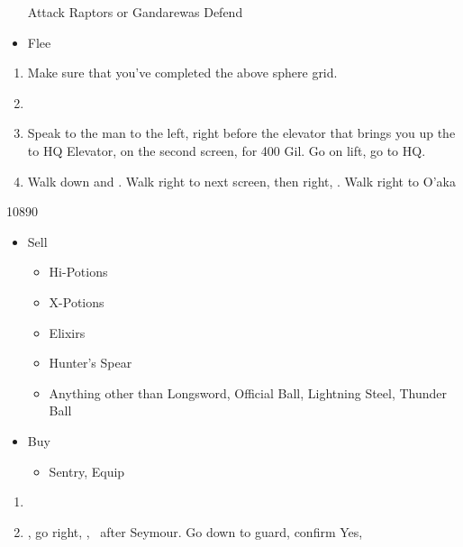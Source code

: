 \begin{encounters}
  \begin{itemize}
    \wakkaf Attack Raptors or Gandarewas
    \yunaf Defend
    \item Flee
  \end{itemize}
\end{encounters}
\begin{enumerate}[resume]
  \item Make sure that you've completed the above sphere grid.
  \item \formation{\tidus}{\yuna}{\wakka}
  \item Speak to the man to the left, right before the elevator that brings you up the to HQ Elevator, on the second screen, for 400 Gil. Go on lift, go to HQ.
  \item Walk down and \sd. Walk right to next screen, then right, \sd. Walk right to O'aka
\end{enumerate}
\begin{shop}{10890}
  \begin{itemize}
    \item Sell
          \begin{itemize}
            \item Hi-Potions
            \item X-Potions
            \item Elixirs
            \item Hunter's Spear
            \item Anything other than Longsword, Official Ball, Lightning Steel, Thunder Ball
          \end{itemize}
    \item Buy
          \begin{itemize}
            \item Sentry, Equip
          \end{itemize}
  \end{itemize}
\end{shop}
\begin{enumerate}[resume]
  \item \save
  \item \sd, go right, \cs[1:00], \sd\ after Seymour. Go down to guard, confirm Yes, \sd
\end{enumerate}
